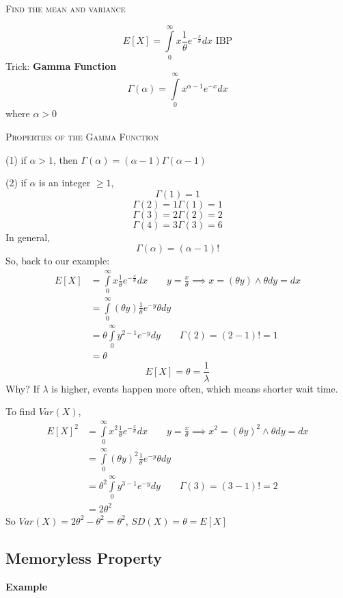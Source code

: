 \textsc{Find the mean and variance}

\[ E[X]=\int\limits_{0}^{\infty} x \frac{1}{\theta}e^{-\frac{x}{\theta}} d{x}  \text{ IBP} \]
Trick: \textbf{Gamma Function}
\[ \Gamma(\alpha)=\int\limits_{0}^{\infty} x^{\alpha -1}e^{-x} d{x}  \]
where $ \alpha>0 $

\textsc{Properties of the Gamma Function}

(1) if $ \alpha>1 $, then $ \Gamma(\alpha)=(\alpha-1)\Gamma(\alpha-1) $

(2) if $ \alpha $ is an integer $ \ge 1 $,
\[ \Gamma(1)=1 \]
\[ \Gamma(2)=1\Gamma(1)=1 \]
\[ \Gamma(3)=2\Gamma(2)=2 \]
\[ \Gamma(4)=3\Gamma(3)=6 \]
In general,
\[ \Gamma(\alpha)=(\alpha-1)! \]
So, back to our example:
\begin{align*}
    E[X] & =\int\limits_{0}^{\infty} x \frac{1}{\theta}e^{-\frac{x}{\theta}} d{x}\qquad y=\frac{x}{\theta}\implies x=(\theta y) \land \theta dy=dx \\
         & =\int\limits_{0}^{\infty} (\theta y) \frac{1}{\theta} e^{-y}\theta d{y}                                                                 \\
         & =\theta \int\limits_{0}^{\infty} y^{2-1}e^{-y} d{y}\qquad \Gamma(2)=(2-1)!=1                                                            \\
         & =\theta
\end{align*}
\[ E[X]=\theta=\frac{1}{\lambda} \]
Why?
If $ \lambda $ is higher, events happen more often, which means shorter wait time.

To find $ Var(X) $,
\begin{align*}
    E[X]^2 & =\int\limits_{0}^{\infty} x^2 \frac{1}{\theta}e^{-\frac{x}{\theta}}  d{x}\qquad y=\frac{x}{\theta}\implies x^2=(\theta y)^2 \land \theta dy=dx \\
           & =\int\limits_{0}^{\infty} (\theta y)^2\frac{1}{\theta}e^{-y}\theta d{y}                                                                        \\
           & =\theta^2 \int\limits_{0}^{\infty} y^{3-1}e^{-y} d{y} \qquad \Gamma(3)=(3-1)!=2                                                                \\
           & =2\theta^2
\end{align*}
So $ Var(X)=2\theta^2-\theta^2=\theta^2 $, $ SD(X)=\theta=E[X] $

\subsection{Memoryless Property}
\textbf{Example}


